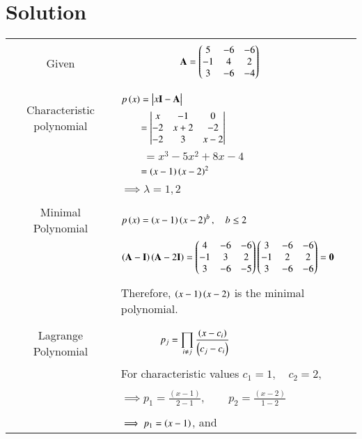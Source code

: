\documentclass[journal,12pt]{IEEEtran}
\begin{document}
\section{\textbf{Solution}}
\renewcommand{\thetable}{2}
\begin{longtable}{|c|l|}
    \hline
    \multirow{3}{*}{Given} 
	& \\
	& $\qquad\qquad\qquad\mathbf{A}=\begin{pmatrix}5&-6&-6\\-1&4&2\\3&-6&-4\end{pmatrix}$\\
	&\\
	\hline
	\multirow{3}{*}{Characteristic polynomial} 
	& \\
	& $p\brak{x}=\mydet{x\Vec{I}-\Vec{A}}$\\
	& $\qquad = \begin{vmatrix}x&-1&0\\-2&x+2&-2\\-2&3&x-2\end{vmatrix}$\\
	& $\qquad=x^3-5x^2+8x-4$\\
	&$\qquad=\left(x-1\right)\left(x-2\right)^2$\\
	&\\
	&$\implies \lambda=1, 2$\\
	&\\
	\hline
	\multirow{3}{*}{Minimal Polynomial} & \\
	& $p\left(x\right)=\left(x-1\right)\left(x-2\right)^b,\quad b\leq2$\\
	&\\
	&$\left(\mathbf{A}-\mathbf{I}\right)\left(\mathbf{A}-2\mathbf{I}\right)=\begin{pmatrix}4&-6&-6\\-1&3&2\\3&-6&-5\end{pmatrix}\begin{pmatrix}3&-6&-6\\-1&2&2\\3&-6&-6\end{pmatrix}=\mathbf{0}$\\
	&\\
	&Therefore, $\left(x-1\right)\left(x-2\right)$ is the minimal polynomial.\\
	&\\
	\hline
	\multirow{3}{*}{Lagrange Polynomial} 
	& \\
	& $\qquad\qquad p_j=\displaystyle\prod_{i\neq j} \frac{\left(x-c_i\right)}{\left(c_j-c_i\right)}$\\
	&\\
	& For characteristic values $c_1=1,\quad c_2=2$,\\
	&\\
	& $\implies p_1=\frac{(x-1)}{2-1}, \qquad p_2=\frac{(x-2)}{1-2}$\\
	&\\
	& $\implies p_1= \left(x-1\right)$, and\\

\end{longtable}
\end{document}
